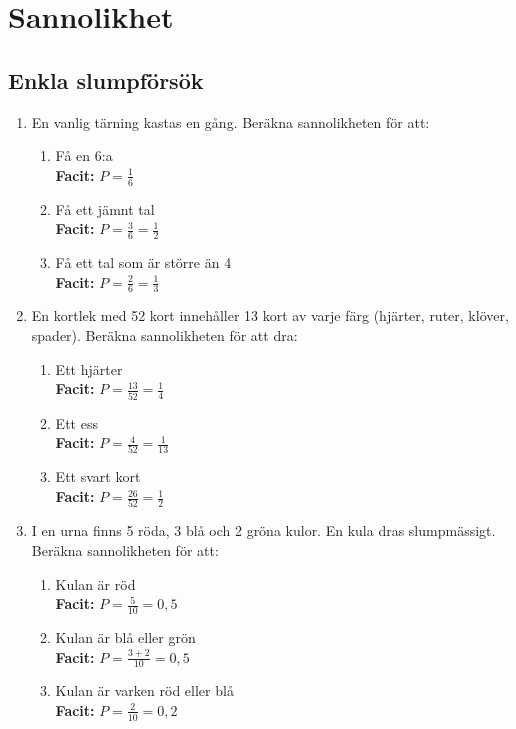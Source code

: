 \documentclass[a4paper,11pt]{article}
\begin{document}
\newpage
\section*{Sannolikhet}

\subsection*{Enkla slumpförsök}

\begin{enumerate}[label=\textbf{\arabic*.}]
    \item En vanlig tärning kastas en gång. Beräkna sannolikheten för att:
    \begin{enumerate}[label=\alph*)]
        \item Få en 6:a
        \\ \textbf{Facit:} $P=\frac{1}{6}$
        \item Få ett jämnt tal
        \\ \textbf{Facit:} $P=\frac{3}{6}=\frac{1}{2}$
        \item Få ett tal som är större än 4
        \\ \textbf{Facit:} $P=\frac{2}{6}=\frac{1}{3}$
    \end{enumerate}
    
    \item En kortlek med 52 kort innehåller 13 kort av varje färg (hjärter, ruter, klöver, spader). Beräkna sannolikheten för att dra:
    \begin{enumerate}[label=\alph*)]
        \item Ett hjärter
        \\ \textbf{Facit:} $P=\frac{13}{52}=\frac{1}{4}$
        \item Ett ess
        \\ \textbf{Facit:} $P=\frac{4}{52}=\frac{1}{13}$
        \item Ett svart kort
        \\ \textbf{Facit:} $P=\frac{26}{52}=\frac{1}{2}$
    \end{enumerate}
    
    \item I en urna finns 5 röda, 3 blå och 2 gröna kulor. En kula dras slumpmässigt. Beräkna sannolikheten för att:
    \begin{enumerate}[label=\alph*)]
        \item Kulan är röd
        \\ \textbf{Facit:} $P=\frac{5}{10}=0,5$
        \item Kulan är blå eller grön
        \\ \textbf{Facit:} $P=\frac{3+2}{10}=0,5$
        \item Kulan är varken röd eller blå
        \\ \textbf{Facit:} $P=\frac{2}{10}=0,2$
    \end{enumerate}
    

\end{enumerate}
\end{document}
